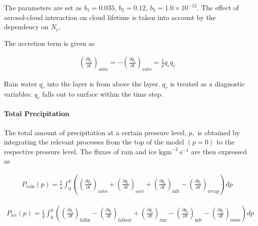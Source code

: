 The parameters are set as \(b_1 = 0.035\), \(b_2 =0.12\),
\(b_3 = 1.0\times10^{-12}\). The effect of aerosol-cloud interaction on
cloud lifetime is taken into account by the dependency on \(N_c\).

The accretion term is given as

\begin{eqnarray}
\left(\frac{\partial q_r}{\partial t}\right)_{\text {auto}}
=-\left(\frac{\partial q_c}{\partial t}\right)_{\text {auto}}
=\frac{1}{\rho}q_c q_r
\end{eqnarray}

Rain water \(q_r\) into the layer is from above the layer. \(q_r\) is
treated as a diagnostic variables: \(q_r\) falls out to surface within
the time step.

\hypertarget{total-precipitation}{%
\paragraph{Total Precipitation}\label{total-precipitation}}

The total amount of precipitation at a certain pressure level, \(p,\) is
obtained by integrating the relevant processes from the top of the model
\((p=0)\) to the respective pressure level. The fluxes of rain and ice
\(\mathrm{kgm}^{-2} \mathrm{~s}^{-1}\) are then expressed as

\begin{eqnarray}
P_{\text {rain}}(p) =\frac{1}{g} \int_{0}^{p}\left(
\left(\frac{\partial q_r}{\partial t}\right)_{\text {auto}}
+\left(\frac{\partial q_r}{\partial t}\right)_{\text {accr}}
+\left(\frac{\partial q_r}{\partial t}\right)_{\text {mlt}}
-\left(\frac{\partial q_r}{\partial t}\right)_{\text {revap}}
\right) d p
\end{eqnarray}

\begin{eqnarray}
P_{\text {ice}}(p)
=\frac{1}{g} \int_{0}^{p}\left(
\left(\frac{\partial q_i}{\partial t}\right)_{\text {fallin}}
-\left(\frac{\partial q_i}{\partial t}\right)_{\text {fallout}}
+\left(\frac{\partial q_i}{\partial t}\right)_{\text {rim}}
-\left(\frac{\partial q_r}{\partial t}\right)_{\text {mlt}}
-\left(\frac{\partial q_r}{\partial t}\right)_{\text {esnw}}
\right) d p
\end{eqnarray}
